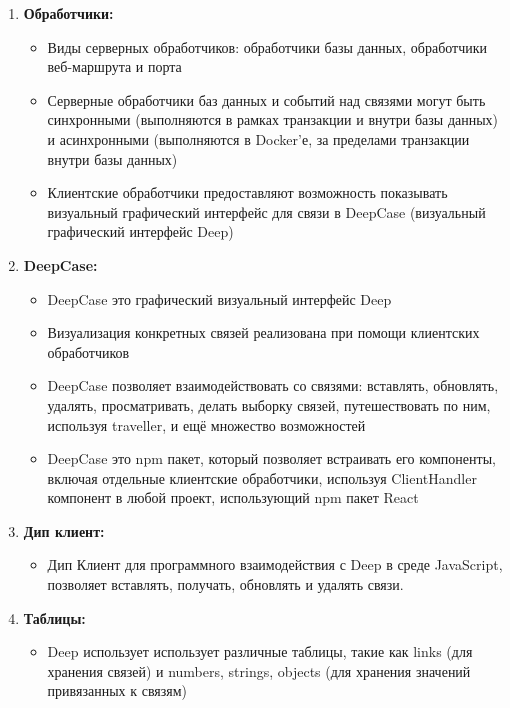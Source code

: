 \documentclass{article}
\begin{document}
\begin{enumerate}
  \item \textbf{Обработчики:}
        \begin{itemize}
          \item Виды серверных обработчиков: обработчики базы данных,
                обработчики веб-маршрута и порта
          \item Серверные обработчики баз данных и событий над связями могут
                быть синхронными (выполняются в рамках транзакции и внутри базы данных) и
                асинхронными (выполняются в Docker'е, за пределами транзакции внутри базы
                данных)
          \item Клиентские обработчики предоставляют возможность показывать
                визуальный графический интерфейс для связи в DeepCase
                (визуальный графический
                интерфейс Deep)
        \end{itemize}

  \item \textbf{DeepCase:}
        \begin{itemize}
          \item DeepCase это графический визуальный интерфейс Deep
          \item Визуализация конкретных связей реализована при помощи
                клиентских обработчиков
          \item DeepCase позволяет взаимодействовать со связями: вставлять,
                обновлять, удалять, просматривать, делать выборку связей,
                путешествовать по ним, используя traveller, и ещё множество возможностей
          \item DeepCase это npm пакет, который позволяет встраивать его
                компоненты, включая отдельные клиентские обработчики, используя ClientHandler
                компонент в любой проект, использующий npm пакет React
        \end{itemize}

  \item \textbf{Дип клиент:}
        \begin{itemize}
          \item Дип Клиент для программного взаимодействия с Deep в среде
                JavaScript, позволяет вставлять, получать, обновлять и удалять
                связи.
        \end{itemize}

  \item \textbf{Таблицы:}
        \begin{itemize}
          \item Deep использует использует различные таблицы, такие как links
                (для хранения связей) и numbers, strings, objects (для хранения значений
                привязанных к связям)
        \end{itemize}
\end{enumerate}
\end{document}

